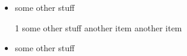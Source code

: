 \begin{itemize}
	\item some other stuff
	\item[1] some other stuff
	\myitem another item
	\myitem[2] another item
	\item some other stuff
\end{itemize}
